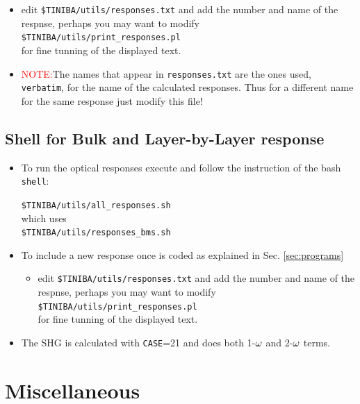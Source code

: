 \documentclass[openany,oneside]{book}
\numberwithin{equation}{section}
\begin{document}
\begin{itemize}
\begin{itemize}
\begin{itemize}
\item edit
\verb=$TINIBA/utils/responses.txt=  
and add the
 number and name of the respnse, perhaps you may want to modify\\
\verb=$TINIBA/utils/print_responses.pl=\\ for fine tunning
of the displayed text. 
\item\textcolor{red}{NOTE:}The names that appear in
  \verb=responses.txt= are the ones used, \verb=verbatim=, for the name
  of the calculated responses. Thus for a different name for the same
  response just modify this file!
\end{itemize}
\end{itemize}

\end{itemize}


\section{Shell for Bulk and Layer-by-Layer response}

\begin{itemize}

\item To run the optical responses execute and follow the instruction of the bash \verb=shell=:

  \verb=$TINIBA/utils/all_responses.sh=\\
which uses\\
\verb=$TINIBA/utils/responses_bms.sh=

\item To include a new response once is coded as explained in
 Sec. \ref{sec:programs} 

\begin{itemize}
\item edit
\verb=$TINIBA/utils/responses.txt=  
and add the
 number and name of the respnse, perhaps you may want to modify\\
\verb=$TINIBA/utils/print_responses.pl=\\ for fine tunning
of the displayed text.
\end{itemize}
\item The SHG is calculated with \verb=CASE==21 and does both 1-$\omega$
  and 2-$\omega$ terms.
\end{itemize}

\chapter{Miscellaneous}
\end{document}
